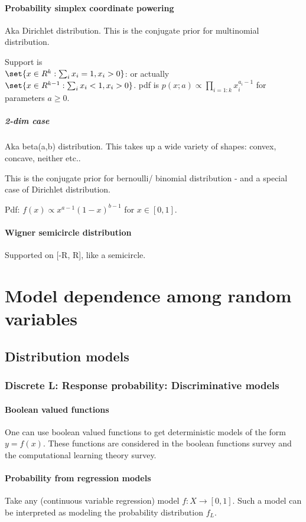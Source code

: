 \documentclass[oneside, article]{memoir}
\begin{document}
\subsection{Probability simplex coordinate powering}
Aka Dirichlet distribution.
This is the conjugate prior for multinomial distribution.

Support is \\$\set{x \in R^{k}: \sum_i x_i = 1, x_i > 0}$: or actually \\$\set{x \in R^{k-1}: \sum_i x_i < 1, x_i > 0}$. pdf is $p(x; a) \propto \prod_{i=1:k} x_i^{a_i - 1}$ for parameters $a \geq0$.

\subsubsection{2-dim case}
Aka beta(a,b) distribution. This takes up a wide variety of shapes: convex, concave, neither etc..

This is the conjugate prior for bernoulli/ binomial distribution - and a special case of Dirichlet distribution.

Pdf: $f(x) \propto x^{a-1}(1-x)^{b-1}$ for $x \in [0, 1]$.

\subsection{Wigner semicircle distribution}
Supported on [-R, R], like a semicircle.

\part{Model dependence among random variables}
\chapter{Distribution models}
\section{Discrete L: Response probability: Discriminative models}
\subsection{Boolean valued functions}
One can use boolean valued functions to get deterministic models of the form $y = f(x)$. These functions are considered in the boolean functions survey and the computational learning theory survey.

\subsection{Probability from regression models}
Take any (continuous variable regression) model $f: X \to [0, 1]$. Such a model can be interpreted as modeling the probability distribution $f_L$.
\end{document}
